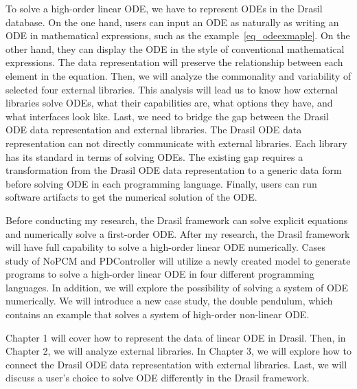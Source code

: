 To solve a high-order linear ODE, we have to represent ODEs in the Drasil database. On the one hand, users can input an ODE as naturally as writing an ODE in mathematical expressions, such as the example~\ref{eq_odeexmaple}. On the other hand, they can display the ODE in the style of conventional mathematical expressions. The data representation will preserve the relationship between each element in the equation. Then, we will analyze the commonality and variability of selected four external libraries. This analysis will lead us to know how external libraries solve ODEs, what their capabilities are, what options they have, and what interfaces look like. Last, we need to bridge the gap between the Drasil ODE data representation and external libraries. The Drasil ODE data representation can not directly communicate with external libraries. Each library has its standard in terms of solving ODEs. The existing gap requires a transformation from the Drasil ODE data representation to a generic data form before solving ODE in each programming language. Finally, users can run software artifacts to get the numerical solution of the ODE.

Before conducting my research, the Drasil framework can solve explicit equations and numerically solve a first-order ODE. After my research, the Drasil framework will have full capability to solve a high-order linear ODE numerically. Cases study of NoPCM and PDController will utilize a newly created model to generate programs to solve a high-order linear ODE in four different programming languages. In addition, we will explore the possibility of solving a system of ODE numerically. We will introduce a new case study, the double pendulum, which contains an example that solves a system of high-order non-linear ODE.

Chapter 1 will cover how to represent the data of linear ODE in Drasil. Then, in Chapter 2, we will analyze external libraries. In Chapter 3, we will explore how to connect the Drasil ODE data representation with external libraries. Last, we will discuss a user's choice to solve ODE differently in the Drasil framework.